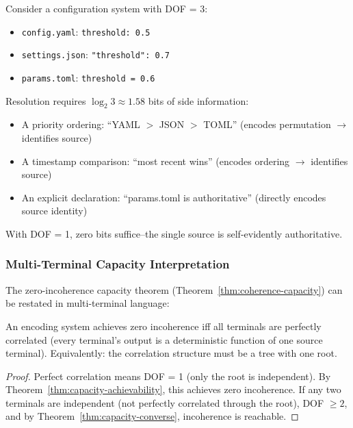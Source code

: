 \begin{example}\label{ex:side-info-practice}
Consider a configuration system with DOF = 3:
\begin{itemize}
\tightlist
\item \texttt{config.yaml}: \texttt{threshold: 0.5}
\item \texttt{settings.json}: \texttt{"threshold": 0.7}
\item \texttt{params.toml}: \texttt{threshold = 0.6}
\end{itemize}

Resolution requires $\log_2 3 \approx 1.58$ bits of side information:
\begin{itemize}
\tightlist
\item A priority ordering: ``YAML $>$ JSON $>$ TOML'' (encodes permutation $\to$ identifies source)
\item A timestamp comparison: ``most recent wins'' (encodes ordering $\to$ identifies source)
\item An explicit declaration: ``params.toml is authoritative'' (directly encodes source identity)
\end{itemize}

With DOF = 1, zero bits suffice--the single source is self-evidently authoritative.
\end{example}

\subsubsection{Multi-Terminal Capacity Interpretation}

The zero-incoherence capacity theorem (Theorem~\ref{thm:coherence-capacity}) can be restated in multi-terminal language:

\begin{corollary}\label{cor:multi-terminal}
An encoding system achieves zero incoherence iff all terminals are perfectly correlated (every terminal's output is a deterministic function of one source terminal). Equivalently: the correlation structure must be a tree with one root.
\end{corollary}

\begin{proof}
Perfect correlation means DOF = 1 (only the root is independent). By Theorem~\ref{thm:capacity-achievability}, this achieves zero incoherence. If any two terminals are independent (not perfectly correlated through the root), DOF $\geq 2$, and by Theorem~\ref{thm:capacity-converse}, incoherence is reachable.
\end{proof}

